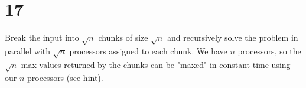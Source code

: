 \documentclass[letterpaper,notitlepage,twoside]{article}
\begin{document}
\section*{17}
Break the input into $\sqrt{n}$ chunks of size $\sqrt{n}$ and recursively solve the problem in parallel with $\sqrt{n}$ processors assigned to each chunk. We have $n$ processors, so the $\sqrt{n}$ max values returned by the chunks can be "maxed" in constant time using our $n$ processors (see hint). 
\end{document}
